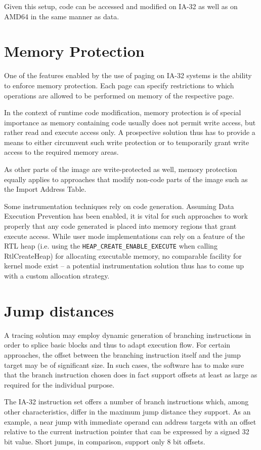 Given this setup, code can be accessed and modified on IA-32 as well as on AMD64
in the same manner as data. 

\section{Memory Protection}
One of the features enabled by the use of paging on IA-32 systems is the ability 
to enforce memory protection. Each page can specify restrictions to
which operations are allowed to be performed on memory of the respective page.

In the context of runtime code modification, memory protection is of special 
importance as memory containing code usually does not permit write access,
but rather read and execute access only. A prospective 
solution thus has to provide a means to either circumvent such write protection 
or to temporarily grant write access to the required memory areas.

As other parts of the image are write-protected as well, memory protection 
equally applies to approaches that modify non-code parts of the image such as 
the Import Address Table.

Some instrumentation techniques rely on code generation. Assuming Data Execution Prevention 
\cite{DEP} has been enabled, it is vital for such approaches to work properly that any code
generated is placed into memory regions that grant execute access. While user mode
implementations can rely on a feature of the RTL heap (i.e. using the
\verb|HEAP_CREATE_ENABLE_EXECUTE| when calling RtlCreateHeap) for allocating executable memory, 
no comparable facility for kernel mode exist -- a potential instrumentation solution
thus has to come up with a custom allocation strategy.

\section{Jump distances}
\label{sec:JumpDistances}
A tracing solution may employ dynamic generation of branching instructions in 
order to splice basic blocks and thus to adapt execution flow. For certain approaches,
the offset between the branching instruction itself and the jump target may be of 
significant size. In such cases, the software has to make sure that
the branch instruction chosen does in fact support offsets at least as large as 
required for the individual purpose.

The IA-32 instruction set offers a number of branch instructions which, among other
characteristics, differ in the maximum jump distance they support. As an example, 
a near jump with immediate operand can address targets with an offset relative 
to the current instruction pointer that can be expressed by a signed
32 bit value. Short jumps, in comparison, support only 8 bit offsets. 

